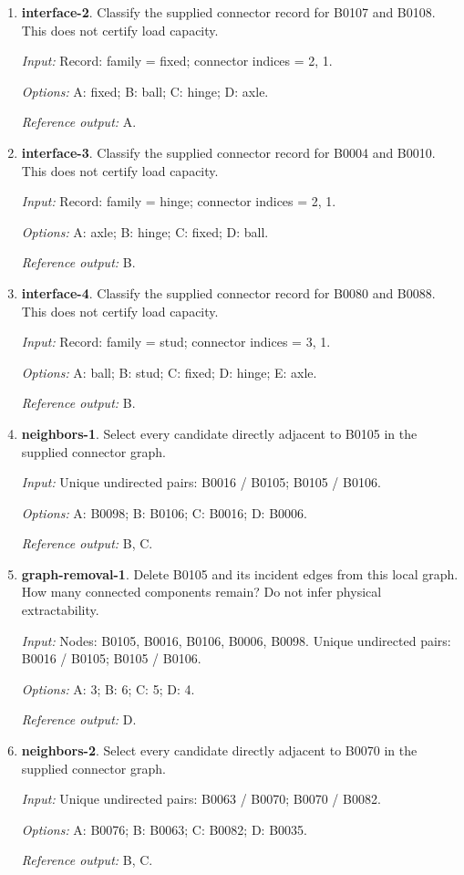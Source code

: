 \begin{enumerate}
\item \textbf{interface-2}. Classify the supplied connector record for B0107 and B0108. This does not certify load capacity.\par {\small \textit{Input:} Record: family = fixed; connector indices = 2, 1. \par\textit{Options:} A: fixed; B: ball; C: hinge; D: axle. \par\textit{Reference output:} A.}
\item \textbf{interface-3}. Classify the supplied connector record for B0004 and B0010. This does not certify load capacity.\par {\small \textit{Input:} Record: family = hinge; connector indices = 2, 1. \par\textit{Options:} A: axle; B: hinge; C: fixed; D: ball. \par\textit{Reference output:} B.}
\item \textbf{interface-4}. Classify the supplied connector record for B0080 and B0088. This does not certify load capacity.\par {\small \textit{Input:} Record: family = stud; connector indices = 3, 1. \par\textit{Options:} A: ball; B: stud; C: fixed; D: hinge; E: axle. \par\textit{Reference output:} B.}
\item \textbf{neighbors-1}. Select every candidate directly adjacent to B0105 in the supplied connector graph.\par {\small \textit{Input:} Unique undirected pairs: B0016 / B0105; B0105 / B0106. \par\textit{Options:} A: B0098; B: B0106; C: B0016; D: B0006. \par\textit{Reference output:} B, C.}
\item \textbf{graph-removal-1}. Delete B0105 and its incident edges from this local graph. How many connected components remain? Do not infer physical extractability.\par {\small \textit{Input:} Nodes: B0105, B0016, B0106, B0006, B0098. Unique undirected pairs: B0016 / B0105; B0105 / B0106. \par\textit{Options:} A: 3; B: 6; C: 5; D: 4. \par\textit{Reference output:} D.}
\item \textbf{neighbors-2}. Select every candidate directly adjacent to B0070 in the supplied connector graph.\par {\small \textit{Input:} Unique undirected pairs: B0063 / B0070; B0070 / B0082. \par\textit{Options:} A: B0076; B: B0063; C: B0082; D: B0035. \par\textit{Reference output:} B, C.}

\end{enumerate}
